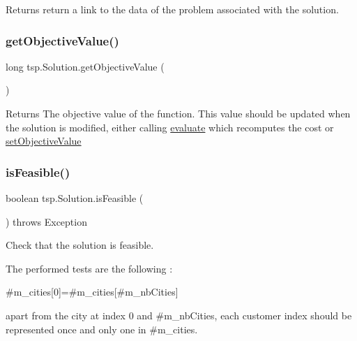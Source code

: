 \begin{DoxyReturn}{Returns}
return a link to the data of the problem associated with the solution. 
\end{DoxyReturn}
\mbox{\label{classtsp_1_1_solution_ab6cbf5af2427f51dc8cad69cb4c7b0f5}} 
\subsubsection{\texorpdfstring{get\+Objective\+Value()}{getObjectiveValue()}}
{\footnotesize\ttfamily long tsp.\+Solution.\+get\+Objective\+Value (\begin{DoxyParamCaption}{ }\end{DoxyParamCaption})\hspace{0.3cm}{\ttfamily [inline]}}

\begin{DoxyReturn}{Returns}
The objective value of the function. This value should be updated when the solution is modified, either calling \mbox{\hyperlink{classtsp_1_1_solution_aab96d9400180cc1854a1a48b848f92a4}{evaluate}} which recomputes the cost or \mbox{\hyperlink{classtsp_1_1_solution_a5cff3a62643a336a021da631afd9f9cb}{set\+Objective\+Value}} 
\end{DoxyReturn}
\mbox{\label{classtsp_1_1_solution_a93a7045acd93ccac25da9c471618f9bc}} 
\subsubsection{\texorpdfstring{is\+Feasible()}{isFeasible()}}
{\footnotesize\ttfamily boolean tsp.\+Solution.\+is\+Feasible (\begin{DoxyParamCaption}{ }\end{DoxyParamCaption}) throws Exception\hspace{0.3cm}{\ttfamily [inline]}}

Check that the solution is feasible.

The performed tests are the following \+:
\begin{DoxyItemize}
\item \#m\+\_\+cities\mbox{[}0\mbox{]}=\#m\+\_\+cities\mbox{[}\#m\+\_\+nb\+Cities\mbox{]}
\item apart from the city at index 0 and \#m\+\_\+nb\+Cities, each customer index should be represented once and only one in \#m\+\_\+cities.
\end{DoxyItemize}


